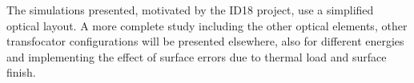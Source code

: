 \documentclass{iucr}              %
\begin{document}




        


The simulations presented, motivated by the ID18 project, use a simplified optical layout. A more complete study including the other optical elements, other transfocator configurations will be presented elsewhere, also for different energies and implementing the effect of surface errors due to thermal load and surface finish. 
\end{document}
